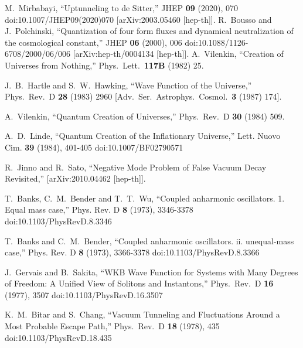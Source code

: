 \documentclass[a4paper,11pt]{article}
\numberwithin{equation}{section}
\begin{document}
\begin{thebibliography}{99}
M.~Mirbabayi,
``Uptunneling to de Sitter,''
JHEP \textbf{09} (2020), 070
doi:10.1007/JHEP09(2020)070
[arXiv:2003.05460 [hep-th]].
R.~Bousso and J.~Polchinski,
``Quantization of four form fluxes and dynamical neutralization of the cosmological constant,''
JHEP \textbf{06} (2000), 006
doi:10.1088/1126-6708/2000/06/006
[arXiv:hep-th/0004134 [hep-th]].
A.~Vilenkin,
  ``Creation of Universes from Nothing,''
  Phys.\ Lett.\  {\bf 117B} (1982) 25.

  J.~B.~Hartle and S.~W.~Hawking,
  ``Wave Function of the Universe,''
  Phys.\ Rev.\ D {\bf 28} (1983) 2960
   [Adv.\ Ser.\ Astrophys.\ Cosmol.\  {\bf 3} (1987) 174].

  A.~Vilenkin,
  ``Quantum Creation of Universes,''
  Phys.\ Rev.\ D {\bf 30} (1984) 509.
 
A.~D.~Linde,
``Quantum Creation of the Inflationary Universe,''
Lett. Nuovo Cim. \textbf{39} (1984), 401-405
doi:10.1007/BF02790571


R.~Jinno and R.~Sato,
``Negative Mode Problem of False Vacuum Decay Revisited,''
[arXiv:2010.04462 [hep-th]].
  
 
T.~Banks, C.~M.~Bender and T.~T.~Wu,
``Coupled anharmonic oscillators. 1. Equal mass case,''
Phys. Rev. D \textbf{8} (1973), 3346-3378
doi:10.1103/PhysRevD.8.3346

T.~Banks and C.~M.~Bender,
``Coupled anharmonic oscillators. ii. unequal-mass case,''
Phys. Rev. D \textbf{8} (1973), 3366-3378
doi:10.1103/PhysRevD.8.3366
  
J.~Gervais and B.~Sakita,
``WKB Wave Function for Systems with Many Degrees of Freedom: A Unified View of Solitons and Instantons,''
Phys.\ Rev.\ D \textbf{16} (1977), 3507
doi:10.1103/PhysRevD.16.3507
  
K.~M.~Bitar and S.~Chang,
``Vacuum Tunneling and Fluctuations Around a Most Probable Escape Path,''
Phys.\ Rev.\ D \textbf{18} (1978), 435
doi:10.1103/PhysRevD.18.435
  

\end{thebibliography}
\end{document}
